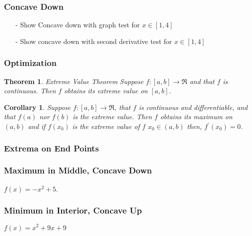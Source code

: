 \documentclass{beamer}
\newtheorem{thm}{Theorem}
\newtheorem{cor}{Corollary}
\numberwithin{equation}{section}
\begin{document}
\begin{frame}
\frametitle{Concave Down} 



\begin{itemize}
\item[-] Show Concave down with graph test for $x \in [1,4]$
\item[-] Show concave down with second derivative test for $x \in [1,4]$
\end{itemize}


\end{frame}



\begin{frame}
\frametitle{Optimization}

\begin{thm} \alert{Extreme Value Theorem} Suppose $f: [a,b] \rightarrow \Re$ and that $f$ is continuous.  Then $f$ obtains its extreme value on $[a,b]$.  
\end{thm}

\begin{cor} Suppose $f: [a,b] \rightarrow \Re$,  that $f$ is continuous and differentiable, and that $f(a)$ nor $f(b)$ is the extreme value.  Then $f$ obtains its maximum on $(a,b)$ and if $f(x_{0})$ is the extreme value of $f$ $x_0 \in (a,b)$ then, $f^{'}(x_{0}) = 0$.  
\end{cor}

\end{frame}


\begin{frame}
\frametitle{Extrema on End Points}



\end{frame}



\begin{frame}
\frametitle{Maximum in Middle, Concave Down}

$f(x) = - x^2 + 5$.  





\end{frame}


\begin{frame}
\frametitle{Minimum in Interior, Concave Up}

$f(x) = x^2 + 9x + 9 $



\end{frame}
\end{document}
